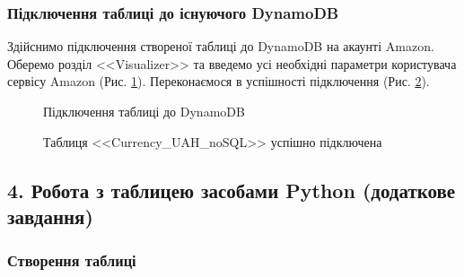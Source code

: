 \documentclass[a4paper,14pt]{extarticle} %
\begin{document}
\subsubsection*{Підключення таблиці до існуючого DynamoDB}

Здійснимо підключення створеної таблиці до DynamoDB на акаунті Amazon. Оберемо розділ <<Visualizer>> та введемо 
усі необхідні параметри користувача сервісу Amazon (Рис. \ref{fig:commint NoSQL}). Переконаємося в успішності 
підключення (Рис. \ref{fig:commint succeed NoSQL}).

\begin{figure}[H]
    \caption{Підключення таблиці до DynamoDB}
    \label{fig:commint NoSQL}
\end{figure}

\begin{figure}[H]
    \caption{Таблиця <<Currency\_UAH\_noSQL>> успішно підключена}
    \label{fig:commint succeed NoSQL}
\end{figure}

\subsection*{4. Робота з таблицею засобами Python (додаткове завдання)}

\subsubsection*{Створення таблиці}
\end{document}
